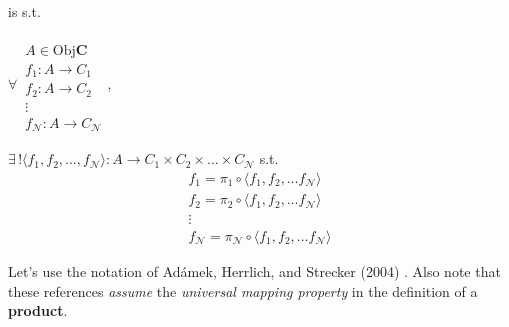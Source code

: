 \begin{definition}[Products]
	is s.t. 
	
	$\forall \, \begin{aligned}  \quad \\ 
	A \in \text{Obj}\mathbf{C} \\
	f_1 : A \to C_1 \\
	f_2 : A \to C_2 \\
	\vdots \\
	f_{\mathcal{N}} : A \to C_{\mathcal{N}} \end{aligned}$, 
	
	$\exists \, ! \langle f_1 ,f_2 , \dots , f_{\mathcal{N}} \rangle : A \to C_1 \times C_2 \times \dots \times C_{\mathcal{N}}$ s.t.
	\[
	\begin{aligned}
	f_1 = \pi_1 \circ \langle f_1 , f_2 , \dots f_{\mathcal{N}} \rangle \\ 
	f_2 = \pi_2 \circ \langle f_1 , f_2 , \dots f_{\mathcal{N}} \rangle \\ 
	\vdots  \\ 
	f_{\mathcal{N}} = \pi_{\mathcal{N}} \circ \langle f_1 , f_2 , \dots f_{\mathcal{N}} \rangle 
	\end{aligned}
	\]
\end{definition}

Let's use the notation of Ad\'{a}mek, Herrlich, and Strecker (2004) \cite{agat:AHS2004}. Also note that these references \emph{assume} the \emph{universal mapping property} in the definition of a \textbf{product}.

